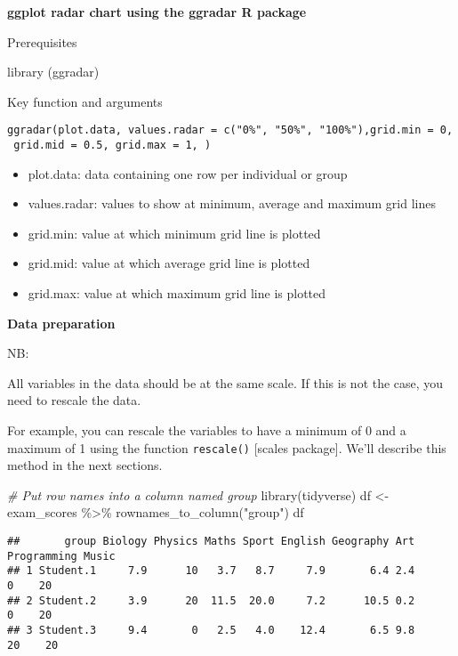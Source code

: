 \documentclass[
]{article}
\newenvironment{Shaded}{\begin{snugshade}}{\end{snugshade}}
\newcommand{\CommentTok}[1]{\textcolor[rgb]{0.56,0.35,0.01}{\textit{#1}}}
\newcommand{\FunctionTok}[1]{\textcolor[rgb]{0.00,0.00,0.00}{#1}}
\newcommand{\NormalTok}[1]{#1}
\newcommand{\OtherTok}[1]{\textcolor[rgb]{0.56,0.35,0.01}{#1}}
\newcommand{\SpecialCharTok}[1]{\textcolor[rgb]{0.00,0.00,0.00}{#1}}
\newcommand{\StringTok}[1]{\textcolor[rgb]{0.31,0.60,0.02}{#1}}
\providecommand{\tightlist}{%
  \setlength{\itemsep}{0pt}\setlength{\parskip}{0pt}}
\begin{document}
\textbf{ggplot radar chart using the ggradar R package}

Prerequisites

\begin{Shaded}
\begin{Highlighting}[]
\FunctionTok{library}\NormalTok{ (ggradar)}
\end{Highlighting}
\end{Shaded}

Key function and arguments

\texttt{ggradar(plot.data,\ values.radar\ =\ c("0\%",\ "50\%",\ "100\%"),grid.min\ =\ 0,\ grid.mid\ =\ 0.5,\ grid.max\ =\ 1,\ )}

\begin{itemize}
\tightlist
\item
  plot.data: data containing one row per individual or group
\item
  values.radar: values to show at minimum, average and maximum grid
  lines
\item
  grid.min: value at which minimum grid line is plotted
\item
  grid.mid: value at which average grid line is plotted
\item
  grid.max: value at which maximum grid line is plotted
\end{itemize}

\textbf{Data preparation}

NB:

All variables in the data should be at the same scale. If this is not
the case, you need to rescale the data.

For example, you can rescale the variables to have a minimum of 0 and a
maximum of 1 using the function \texttt{rescale()} {[}scales package{]}.
We'll describe this method in the next sections.

\begin{Shaded}
\begin{Highlighting}[]
\CommentTok{\# Put row names into  a column named group}
\FunctionTok{library}\NormalTok{(tidyverse)}
\NormalTok{df }\OtherTok{\textless{}{-}}\NormalTok{ exam\_scores }\SpecialCharTok{\%\textgreater{}\%} \FunctionTok{rownames\_to\_column}\NormalTok{(}\StringTok{"group"}\NormalTok{)}
\NormalTok{df}
\end{Highlighting}
\end{Shaded}

\begin{verbatim}
##       group Biology Physics Maths Sport English Geography Art Programming Music
## 1 Student.1     7.9      10   3.7   8.7     7.9       6.4 2.4           0    20
## 2 Student.2     3.9      20  11.5  20.0     7.2      10.5 0.2           0    20
## 3 Student.3     9.4       0   2.5   4.0    12.4       6.5 9.8          20    20
\end{verbatim}
\end{document}

